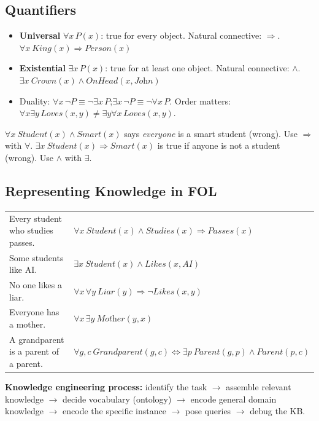 \subsection{Quantifiers}
\begin{itemize}
\item \textbf{Universal} $\forall x\, P(x)$: true for every object. Natural connective: $\Rightarrow$. \ \ $\forall x\ \textit{King}(x)\Rightarrow\textit{Person}(x)$
\item \textbf{Existential} $\exists x\, P(x)$: true for at least one object. Natural connective: $\wedge$. \ \ $\exists x\ \textit{Crown}(x)\wedge\textit{OnHead}(x,\textit{John})$
\item Duality: $\forall x\,\neg P \equiv \neg\exists x\,P$;\quad $\exists x\,\neg P\equiv\neg\forall x\,P$. Order matters: $\forall x\exists y\,\textit{Loves}(x,y)\ne\exists y\forall x\,\textit{Loves}(x,y)$.
\end{itemize}
\begin{caution}
$\forall x\ \textit{Student}(x)\wedge\textit{Smart}(x)$ says \emph{everyone} is a smart student (wrong). Use $\Rightarrow$ with $\forall$.
$\exists x\ \textit{Student}(x)\Rightarrow\textit{Smart}(x)$ is true if anyone is not a student (wrong). Use $\wedge$ with $\exists$.
\end{caution}
\subsection{Representing Knowledge in FOL}
\begin{example}
\small
\begin{tabular}{@{}p{6.3cm}p{8.2cm}@{}}
Every student who studies passes. & $\forall x\ \textit{Student}(x)\wedge\textit{Studies}(x)\Rightarrow\textit{Passes}(x)$\\
Some students like AI. & $\exists x\ \textit{Student}(x)\wedge\textit{Likes}(x,\textit{AI})$\\
No one likes a liar. & $\forall x\,\forall y\ \textit{Liar}(y)\Rightarrow\neg\textit{Likes}(x,y)$\\
Everyone has a mother. & $\forall x\,\exists y\ \textit{Mother}(y,x)$\\
A grandparent is a parent of a parent. & $\forall g,c\ \textit{Grandparent}(g,c)\Leftrightarrow\exists p\ \textit{Parent}(g,p)\wedge\textit{Parent}(p,c)$\\
\end{tabular}
\end{example}
\textbf{Knowledge engineering process:} identify the task $\rightarrow$ assemble relevant knowledge $\rightarrow$ decide vocabulary (ontology) $\rightarrow$ encode general domain knowledge $\rightarrow$ encode the specific instance $\rightarrow$ pose queries $\rightarrow$ debug the KB.

